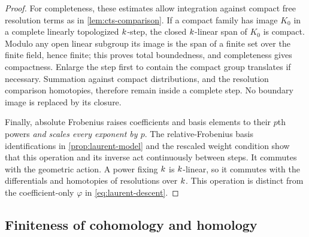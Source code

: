 \begin{proof}
For completeness, these estimates allow integration against
compact free resolution terms as in \cref{lem:cts-comparison}.
If a compact family has image $K_0$ in a complete linearly
topologized $k$-step, the closed $k$-linear span of $K_0$ is
compact.  Modulo any open linear subgroup its image is the span
of a finite set over the finite field, hence finite; this proves
total boundedness, and completeness gives compactness.  Enlarge
the step first to contain the compact group translates if
necessary.  Summation against compact distributions, and the
resolution comparison homotopies, therefore remain inside a
complete step.  No boundary image is replaced by its closure.

Finally, absolute Frobenius raises coefficients and basis
elements to their $p$th powers \emph{and scales every exponent by
$p$}.  The relative-Frobenius basis identifications in
\cref{prop:laurent-model} and the rescaled weight condition show
that this operation and its inverse act continuously between
steps.  It commutes with the geometric action.  A power fixing
$k$ is $k$-linear, so it commutes with the differentials and
homotopies of resolutions over $k$.  This operation is distinct
from the coefficient-only $\varphi$ in
\cref{eq:laurent-descent}.
\end{proof}

\subsection{Finiteness of cohomology and homology}


